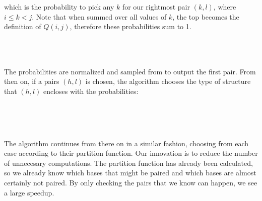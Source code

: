 which is the probability to pick any $k$ for our rightmost pair
$(k,l)$, where $i \leq k < j$. Note that when summed over all values
of $k$, the top becomes the definition of $Q(i,j)$, therefore these
probabilities sum to 1.

\begin{equation}
[TODO: clarify equations with Aalberts]
\end{equation}

\begin{equation}

\end{equation}

\begin{equation}

\end{equation}

\begin{equation}

\end{equation}

The probabilities are normalized and sampled from to output the first
pair. From then on, if a pairs $(h,l)$ is chosen, the algorithm
chooses the type of structure that $(h,l)$ encloses with the
probabilities:

\begin{equation}

\end{equation}

\begin{equation}

\end{equation}

\begin{equation}

\end{equation}

\begin{equation}

\end{equation}

\begin{equation}

\end{equation}

The algorithm continues from there on in a similar fashion, choosing
from each case according to their partition function. Our innovation
is to reduce the number of unnecesary computations. The partition
function has already been calculated, so we already know which bases
that might be paired and which bases are almost certainly not
paired. By only checking the pairs that we know can happen, we see a
large speedup.

